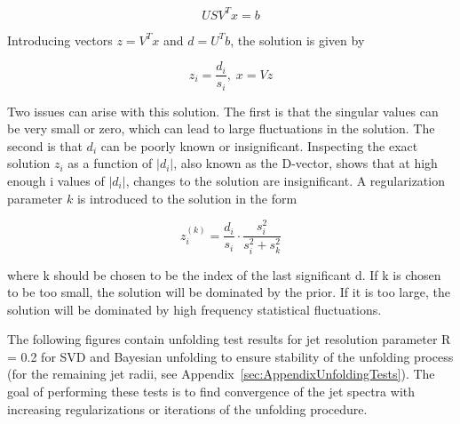 \begin{equation}
    USV^Tx = b
\end{equation}

\noindent
Introducing vectors $z = V^Tx$ and $d = U^Tb$, the solution is given by

\begin{equation}
    z_i = \frac{d_i}{s_i}, \; x = Vz
\end{equation}

\noindent 
Two issues can arise with this solution. The first is that the singular values can be very small or zero, which can lead to large fluctuations in the solution. The second is that $d_i$ can be poorly known or insignificant. Inspecting the exact solution $z_i$ as a function of $|d_i|$, also known as the D-vector, shows that at high enough i values of $|d_i|$, changes to the solution are insignificant. A regularization parameter $k$ is introduced to the solution in the form 

\begin{equation}
    z_i^{(k)} = \frac{d_i}{s_i}\cdot \frac{s_i^2}{s_i^2 + s_k^2}
\end{equation}

\noindent
where k should be chosen to be the index of the last significant d. If k is chosen to be too small, the solution will be dominated by the prior. If it is too large, the solution will be dominated by high frequency statistical fluctuations.

The following figures contain unfolding test results for jet resolution parameter R = 0.2 for SVD and Bayesian unfolding to ensure stability of the unfolding process (for the remaining jet radii, see Appendix~\ref{sec:AppendixUnfoldingTests}). The goal of performing these tests is to find convergence of the jet spectra with increasing regularizations or iterations of the unfolding procedure.


